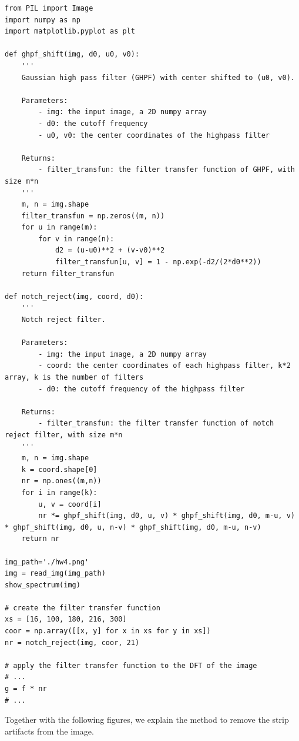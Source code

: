 \documentclass[UTF8]{ctexart}
\begin{document}
\begin{lstlisting}
from PIL import Image
import numpy as np
import matplotlib.pyplot as plt
    
def ghpf_shift(img, d0, u0, v0):
    '''
    Gaussian high pass filter (GHPF) with center shifted to (u0, v0).
    
    Parameters:
        - img: the input image, a 2D numpy array
        - d0: the cutoff frequency
        - u0, v0: the center coordinates of the highpass filter
        
    Returns:
        - filter_transfun: the filter transfer function of GHPF, with size m*n
    '''
    m, n = img.shape
    filter_transfun = np.zeros((m, n))
    for u in range(m):
        for v in range(n):
            d2 = (u-u0)**2 + (v-v0)**2
            filter_transfun[u, v] = 1 - np.exp(-d2/(2*d0**2))
    return filter_transfun

def notch_reject(img, coord, d0):
    '''
    Notch reject filter.
    
    Parameters:
        - img: the input image, a 2D numpy array
        - coord: the center coordinates of each highpass filter, k*2 array, k is the number of filters
        - d0: the cutoff frequency of the highpass filter
        
    Returns:
        - filter_transfun: the filter transfer function of notch reject filter, with size m*n
    '''
    m, n = img.shape
    k = coord.shape[0]
    nr = np.ones((m,n))
    for i in range(k):
        u, v = coord[i]
        nr *= ghpf_shift(img, d0, u, v) * ghpf_shift(img, d0, m-u, v) * ghpf_shift(img, d0, u, n-v) * ghpf_shift(img, d0, m-u, n-v)
    return nr

img_path='./hw4.png'
img = read_img(img_path)
show_spectrum(img)

# create the filter transfer function
xs = [16, 100, 180, 216, 300]
coor = np.array([[x, y] for x in xs for y in xs])
nr = notch_reject(img, coor, 21)

# apply the filter transfer function to the DFT of the image
# ...
g = f * nr
# ...
\end{lstlisting}

Together with the following figures, we explain the method to remove the strip artifacts from the image.\\
\end{document}
